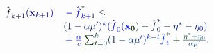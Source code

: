 \documentclass[12pt]{article}
\begin{document}
\makeatletter
\renewcommand*{\@textcolor}[3]{%
  \protect\leavevmode
  \begingroup
    \color#1{#2}#3%
  \endgroup
}
\makeatother
\begin{displaymath}
\begin{array} {rl} { {\mathcolor[RGB]{0,0,15}{\hat { \mathcolor[RGB]{0,0,30}{f} } }} _ { \mathcolor[RGB]{0,0,45}{k} \mathcolor[RGB]{0,0,60}{+} \mathcolor[RGB]{0,0,75}{1} } \mathcolor[RGB]{0,0,90}{(} { \mathcolor[RGB]{0,0,105}{\bf} \mathcolor[RGB]{0,0,120}{x} } _ { \mathcolor[RGB]{0,0,135}{k} \mathcolor[RGB]{0,0,150}{+} \mathcolor[RGB]{0,0,165}{1} } \mathcolor[RGB]{0,0,180}{)} } & { { } \mathcolor[RGB]{0,0,195}{-} {\mathcolor[RGB]{0,0,210}{\hat { \mathcolor[RGB]{0,0,225}{f} } }} _ { \mathcolor[RGB]{0,0,240}{k} \mathcolor[RGB]{0,0,255}{+} \mathcolor[RGB]{0,15,0}{1} } ^ { \mathcolor[RGB]{0,15,15}{*} } \mathcolor[RGB]{0,15,30}{\leq} } \\ & { { } \mathcolor[RGB]{0,15,45}{(} \mathcolor[RGB]{0,15,60}{1} \mathcolor[RGB]{0,15,75}{-} \mathcolor[RGB]{0,15,90}{\alpha} \mathcolor[RGB]{0,15,105}{\mu} ^ { \mathcolor[RGB]{0,15,120}{\prime} } \mathcolor[RGB]{0,15,135}{)} ^ { \mathcolor[RGB]{0,15,150}{k} } \mathcolor[RGB]{0,15,165}{(} {\mathcolor[RGB]{0,15,180}{\hat { \mathcolor[RGB]{0,15,195}{f} } }} _ { \mathcolor[RGB]{0,15,210}{0} } \mathcolor[RGB]{0,15,225}{(} { \mathcolor[RGB]{0,15,240}{\bf} \mathcolor[RGB]{0,15,255}{x} _ { \mathcolor[RGB]{0,30,0}{0} } } \mathcolor[RGB]{0,30,15}{)} \mathcolor[RGB]{0,30,30}{-} {\mathcolor[RGB]{0,30,45}{\hat { \mathcolor[RGB]{0,30,60}{f} } }} _ { \mathcolor[RGB]{0,30,75}{0} } ^ { \mathcolor[RGB]{0,30,90}{*} } \mathcolor[RGB]{0,30,105}{-} \mathcolor[RGB]{0,30,120}{\eta} ^ { \mathcolor[RGB]{0,30,135}{*} } \mathcolor[RGB]{0,30,150}{-} \mathcolor[RGB]{0,30,165}{\eta} _ { \mathcolor[RGB]{0,30,180}{0} } \mathcolor[RGB]{0,30,195}{)} } \\ & { { } \mathcolor[RGB]{0,30,210}{+} \mathcolor[RGB]{0,30,225}{\frac { \mathcolor[RGB]{0,30,240}{\alpha} } { \mathcolor[RGB]{0,30,255}{c} } } \mathcolor[RGB]{0,45,0}{\sum} _ { \mathcolor[RGB]{0,45,15}{t} \mathcolor[RGB]{0,45,30}{=} \mathcolor[RGB]{0,45,45}{0} } ^ { \mathcolor[RGB]{0,45,60}{k} } \mathcolor[RGB]{0,45,75}{(} \mathcolor[RGB]{0,45,90}{1} \mathcolor[RGB]{0,45,105}{-} \mathcolor[RGB]{0,45,120}{\alpha} \mathcolor[RGB]{0,45,135}{\mu} ^ { \mathcolor[RGB]{0,45,150}{\prime} } \mathcolor[RGB]{0,45,165}{)} ^ { \mathcolor[RGB]{0,45,180}{k} \mathcolor[RGB]{0,45,195}{-} \mathcolor[RGB]{0,45,210}{t} } {\mathcolor[RGB]{0,45,225}{\hat { \mathcolor[RGB]{0,45,240}{f} } }} _ { \mathcolor[RGB]{0,45,255}{t} } ^ { \mathcolor[RGB]{0,60,0}{*} } \mathcolor[RGB]{0,60,15}{+} \mathcolor[RGB]{0,60,30}{\frac { \mathcolor[RGB]{0,60,45}{\eta} ^ { \mathcolor[RGB]{0,60,60}{*} } \mathcolor[RGB]{0,60,75}{+} \mathcolor[RGB]{0,60,90}{\eta} _ { \mathcolor[RGB]{0,60,105}{0} } } { \mathcolor[RGB]{0,60,120}{\alpha} \mathcolor[RGB]{0,60,135}{\mu} ^ { \mathcolor[RGB]{0,60,150}{\prime} } } } \mathcolor[RGB]{0,60,165}{.} } \end{array}
\end{displaymath}
\end{document}
